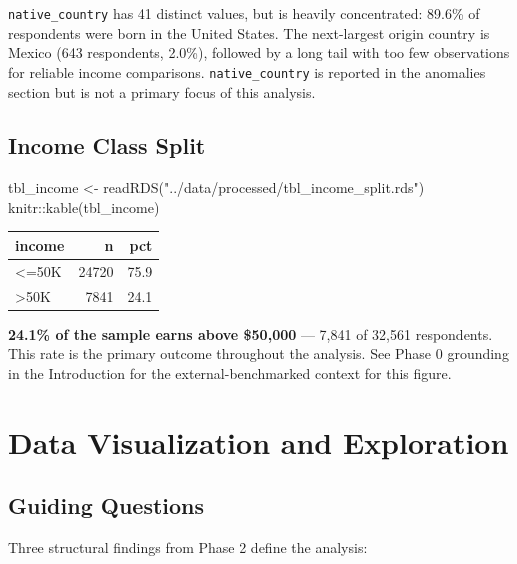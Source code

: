 \documentclass[
  letterpaper,
  DIV=11,
  numbers=noendperiod]{scrartcl}
\newenvironment{Shaded}{\begin{snugshade}}{\end{snugshade}}
\newcommand{\FunctionTok}[1]{\textcolor[rgb]{0.28,0.35,0.67}{#1}}
\newcommand{\NormalTok}[1]{\textcolor[rgb]{0.00,0.23,0.31}{#1}}
\newcommand{\OtherTok}[1]{\textcolor[rgb]{0.00,0.23,0.31}{#1}}
\newcommand{\SpecialCharTok}[1]{\textcolor[rgb]{0.37,0.37,0.37}{#1}}
\newcommand{\StringTok}[1]{\textcolor[rgb]{0.13,0.47,0.30}{#1}}
\begin{document}
\texttt{native\_country} has 41 distinct values, but is heavily
concentrated: 89.6\% of respondents were born in the United States. The
next-largest origin country is Mexico (643 respondents, 2.0\%), followed
by a long tail with too few observations for reliable income
comparisons. \texttt{native\_country} is reported in the anomalies
section but is not a primary focus of this analysis.

\subsection{Income Class Split}\label{income-class-split}

\begin{Shaded}
\begin{Highlighting}[]
\NormalTok{tbl\_income }\OtherTok{\textless{}{-}} \FunctionTok{readRDS}\NormalTok{(}\StringTok{"../data/processed/tbl\_income\_split.rds"}\NormalTok{)}
\NormalTok{knitr}\SpecialCharTok{::}\FunctionTok{kable}\NormalTok{(tbl\_income)}
\end{Highlighting}
\end{Shaded}

\begin{longtable}[]{@{}lrr@{}}
\toprule\noalign{}
income & n & pct \\
\midrule\noalign{}
\endhead
\bottomrule\noalign{}
\endlastfoot
\textless=50K & 24720 & 75.9 \\
\textgreater50K & 7841 & 24.1 \\
\end{longtable}

\textbf{24.1\% of the sample earns above \$50,000} --- 7,841 of 32,561
respondents. This rate is the primary outcome throughout the analysis.
See Phase 0 grounding in the Introduction for the external-benchmarked
context for this figure.

\section{Data Visualization and
Exploration}\label{data-visualization-and-exploration}

\subsection{Guiding Questions}\label{guiding-questions}

Three structural findings from Phase 2 define the analysis:
\end{document}

